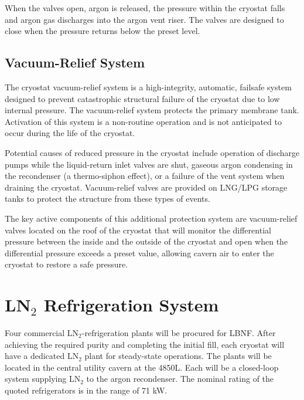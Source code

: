 When the valves open, argon is released, the pressure within the 
cryostat falls and argon gas discharges into the argon vent riser.  
The valves are designed to close when the pressure returns below 
the preset level.

\subsection{Vacuum-Relief System}

The cryostat vacuum-relief system is a high-integrity, 
automatic, failsafe system designed to prevent catastrophic 
structural failure of the cryostat due to low internal pressure.  
The vacuum-relief system protects the primary membrane tank. 
Activation of this system is a non-routine operation and is 
not anticipated to occur during the life of the cryostat. 

Potential causes of reduced pressure in the cryostat include 
operation of discharge pumps while the liquid-return inlet 
valves are shut, gaseous argon condensing in the recondenser 
(a thermo-siphon effect), or a failure of the vent system 
when draining the cryostat. Vacuum-relief valves are provided 
on LNG/LPG storage tanks to protect the structure from these 
types of events.  


The key active components of this additional protection system 
are vacuum-relief valves located on the roof of the cryostat 
that will monitor the differential pressure between the inside 
and the outside of the cryostat and open when the differential 
pressure exceeds a preset value, allowing cavern air to enter 
the cryostat to restore a safe pressure. 

\section{LN$_2$ Refrigeration System}
\label{sec:ln-refrig-sys}
Four commercial LN$_2$-refrigeration plants will be procured for LBNF.  
After achieving the required purity and completing the initial fill, each 
cryostat will have a dedicated LN$_2$ plant for steady-state operations.
The plants will be located in the central utility cavern at the 
4850L. Each will be a closed-loop system supplying LN$_2$
to the argon recondenser. The nominal rating of the quoted
refrigerators is in the range of 71 kW.

